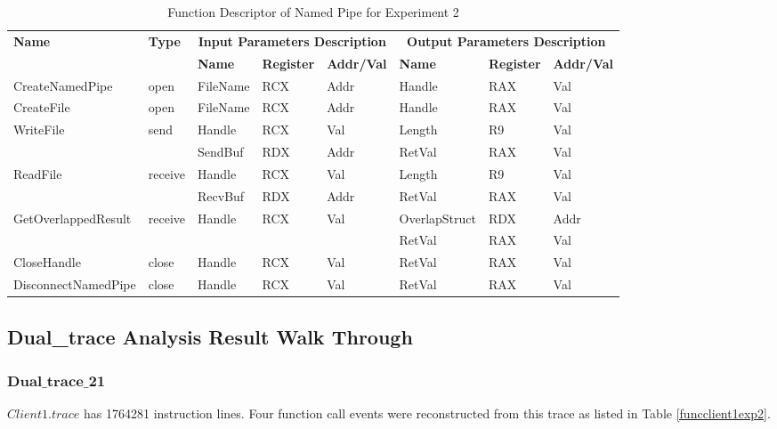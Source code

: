 \begin{table}[H]
  \centering
  \caption{Function Descriptor of Named Pipe for Experiment 2}
  \label{fdescexp2}
\begin{tabular}{|l|l|l|l|l|l|l|l|}
\hline
             \multirow{2}{*}{{\textbf{Name}}} & \multirow{2}{*}{{\textbf{Type}}} & \multicolumn{3}{c|}{\textbf{Input Parameters Description}} & \multicolumn{3}{c|}{\textbf{Output Parameters Description}} \\
              \cline{3-8} 
             & & \textbf{Name}& \textbf{Register} & \textbf{Addr/Val} & \textbf{Name}& \textbf{Register} &  \textbf{Addr/Val}  \\
             \hline
      CreateNamedPipe
       &open & FileName & RCX  & Addr &  Handle & RAX & Val\\
      \hline         
      CreateFile
       &open & FileName & RCX & Addr&  Handle & RAX & Val\\ 
      \hline              
      \multirow{2}{*}{WriteFile}
       &\multirow{2}{*}{send} &  Handle & RCX & Val & Length & R9 & Val\\
        \cline{3-8} 
       & & SendBuf & RDX & Addr & RetVal& RAX & Val\\
      \hline            
      \multirow{2}{*}{ReadFile}
       &\multirow{2}{*}{receive} &  Handle & RCX & Val& Length & R9 & Val\\
        \cline{3-8} 
       & & RecvBuf & RDX  & Addr & RetVal& RAX & Val\\
      \hline    
           \multirow{2}{*}{GetOverlappedResult} &
       \multirow{2}{*}{receive} &  \multirow{2}{*}{Handle} & \multirow{2}{*}{RCX} & \multirow{2}{*}{Val} &OverlapStruct &RDX & Addr\\
               \cline{6-8} 
       & &  &   &  & RetVal& RAX & Val\\
      \hline     
      CloseHandle &
       close &  Handle & RCX & Val & RetVal& RAX & Val\\
      \hline            
      DisconnectNamedPipe &
      close &  Handle & RCX & Val & RetVal& RAX & Val\\
      \hline               
  \end{tabular}  
\end{table} 

\subsection{Dual\_trace Analysis Result Walk Through}
\subsubsection{$\boldsymbol{Dual\_trace\_21}$}
$Client1.trace$ has 1764281 instruction lines. Four function call events were reconstructed from this trace as listed in Table \ref{funcclient1exp2}.

